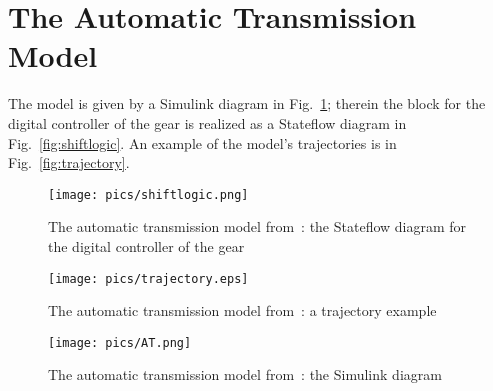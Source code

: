 \documentclass[envcountsect,orivec]{llncs} \usepackage{etex} \usepackage[]{graphicx}
\begin{document}
\section{ The Automatic Transmission
 Model~\cite{HoxhaAF14arch1}}\label{appendix:ATModel}
The model is given by a Simulink diagram in Fig.~\ref{fig:AT}; therein
the block for the digital
   controller of the gear is realized as a Stateflow diagram in
   Fig.~\ref{fig:shiftlogic}. An example of the model's trajectories is
   in Fig.~\ref{fig:trajectory}.

\begin{figure}[hbp]
   \begin{minipage}{.48\textwidth}
     \texttt{[image: pics/shiftlogic.png]}
     \caption{The automatic transmission model
       from~\cite{HoxhaAF14arch1}: the Stateflow diagram for the digital
       controller of the gear}
     \label{fig:shiftlogic}
   \end{minipage}\quad
   \begin{minipage}{.45\textwidth}
     \texttt{[image: pics/trajectory.eps]}
     \caption{The automatic transmission model
       from~\cite{HoxhaAF14arch1}: a   trajectory example}
     \label{fig:trajectory}
   \end{minipage}
   \centering
   \texttt{[image: pics/AT.png]}
   \caption{The automatic transmission model
     from~\cite{HoxhaAF14arch1}: the Simulink diagram}\label{fig:AT}
\end{figure}
\end{document}
